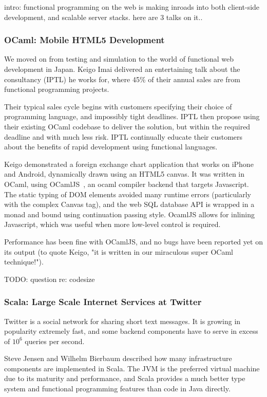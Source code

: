 \documentclass{jfp1}
\begin{document}
intro: functional programming on the web is making inroads into both client-side development, and scalable server stacks. here are 3 talks on it..

\subsubsection{OCaml: Mobile HTML5 Development}

We moved on from testing and simulation to the world of functional web
development in Japan. Keigo Imai delivered an entertaining talk about the
consultancy (IPTL) he works for, where 45\% of their annual sales are from
functional programming projects.

Their typical sales cycle begins with customers specifying their choice of
programming language, and impossibly tight deadlines. IPTL then propose using
their existing OCaml codebase to deliver the solution, but within the required
deadline and with much less risk. IPTL continually educate their customers
about the benefits of rapid development using functional languages.

Keigo demonstrated a foreign exchange chart application that works on iPhone
and Android, dynamically drawn using an HTML5 canvas. It was written in OCaml,
using OCamlJS~\cite{x}, an ocaml compiler backend that targets Javascript. The 
static typing of DOM elements avoided many runtime errors (particularly with the
complex Canvas tag), and the web SQL database API is wrapped in a monad and
bound using continuation passing style. OcamlJS allows for inlining Javascript,
which was useful when more low-level control is required.

Performance has been fine with OCamlJS, and no bugs have been reported yet on
its output (to quote Keigo, "it is written in our miraculous super OCaml
technique!").

TODO: question re: codesize


\subsubsection{Scala: Large Scale Internet Services at Twitter}

Twitter is a social network for sharing short text messages. It is growing in
popularity extremely fast, and some backend components have to serve in 
excess of $10^6$ queries per second.

Steve Jensen and Wilhelm Bierbaum described how many infrastructure components
are implemented in Scala.  The JVM is the preferred virtual machine due to its maturity
and performance, and Scala provides a much better type system and functional
programming features than code in Java directly.
\end{document}
